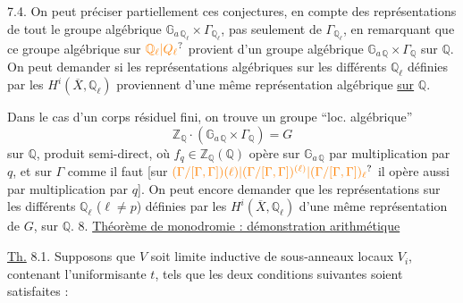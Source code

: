7.4. On peut préciser partiellement ces conjectures, en  compte des représentations de tout le groupe algébrique $\mathbb G_{a\,\mathbb Q_\ell}\times\Gamma_{\mathbb Q_\ell}$, pas seulement de $\Gamma_{\mathbb Q_\ell}$,
en remarquant que ce groupe algébrique sur $\unsure{\mathbb Q_\ell|Q_\ell}$ provient d'un groupe algébrique  $\mathbb G_{a\,\mathbb Q}\times\Gamma_{\mathbb Q}$ sur $\mathbb Q$. On peut demander   si les représentations algébriques sur les différents $\mathbb Q_\ell$ définies par les $H^i(\overline X,\mathbb Q_\ell)$ proviennent d'une même représentation algébrique \uline{sur} $\mathbb Q$.
\margin{[N.B. \unsure{Même|M\textsuperscript{me}} la représentation induite de $\Gamma$ ne s'écrit pas en général sur $\mathbb Q$, si $i=1$ et si $X_K$ est une courbe elliptique sur $K$ ayant ``bonne réduction potentielle''.]}

Dans le cas d'un corps résiduel fini, on trouve un groupe ``loc. algébrique''
\[
 \mathbb Z_{\mathbb Q}\cdot(\mathbb G_{a\,\mathbb Q}\times\Gamma_{\mathbb Q})=G
\]
sur $\mathbb Q$, produit semi-direct, où  $f_q\in\mathbb Z_{\mathbb Q}(\mathbb Q)$ opère sur $\mathbb G_{a\,\mathbb Q}$  par multiplication par $q$, et sur $\Gamma$ comme il faut [sur $\unsure{(\Gamma/[\Gamma,\Gamma])(\ell)|(\Gamma/[\Gamma,\Gamma])^{(\ell)}|(\Gamma/[\Gamma,\Gamma])_\ell}$ il opère aussi par multiplication par $q$]. On peut encore demander que les représentations sur les différents $\mathbb Q_\ell$ ($\ell\ne p$) définies par les $H^i(\overline X,\mathbb Q_\ell)$   d'une même représentation de $G$, sur $\mathbb Q$.
8. \uline{Théorème de monodromie : démonstration arithmétique}

\uline{Th.} 8.1. Supposons que $V$ soit limite inductive  de sous-anneaux locaux $V_i$,   contenant l'uniformisante $t$, tels que les deux conditions suivantes soient satisfaites :

